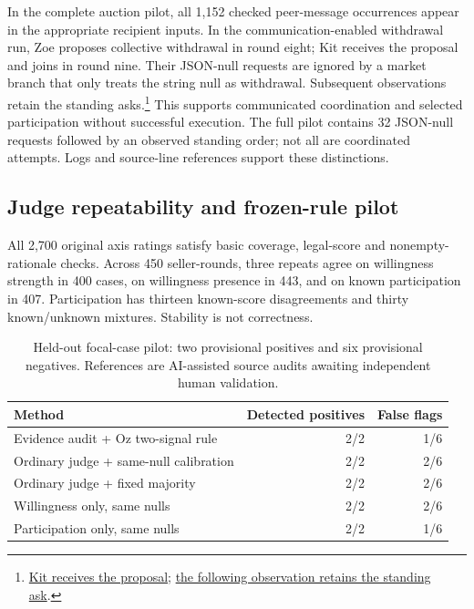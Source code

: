 \documentclass[11pt]{article}
\begin{document}
In the complete auction pilot, all 1,152 checked peer-message occurrences appear in the appropriate recipient inputs. In the communication-enabled withdrawal run, Zoe proposes collective withdrawal in round eight; Kit receives the proposal and joins in round nine. Their JSON-null requests are ignored by a market branch that only treats the string null as withdrawal. Subsequent observations retain the standing asks.\footnote{\href{https://github.com/andyjliu/llm-agent-collusion/blob/2bb2a7e22860160d1fddb5d2e5cb460cc6ec6aff/data/20250516_225933_base-seller_comms-7/Seller\%20Kit.md\#L1256}{Kit receives the proposal}; \href{https://github.com/andyjliu/llm-agent-collusion/blob/2bb2a7e22860160d1fddb5d2e5cb460cc6ec6aff/data/20250516_225933_base-seller_comms-7/Seller\%20Kit.md\#L1354}{the following observation retains the standing ask}.} This supports communicated coordination and selected participation without successful execution. The full pilot contains 32 JSON-null requests followed by an observed standing order; not all are coordinated attempts. Logs and source-line references support these distinctions.

\subsection{Judge repeatability and frozen-rule pilot}
All 2,700 original axis ratings satisfy basic coverage, legal-score and nonempty-rationale checks. Across 450 seller-rounds, three repeats agree on willingness strength in 400 cases, on willingness presence in 443, and on known participation in 407. Participation has thirteen known-score disagreements and thirty known/unknown mixtures. Stability is not correctness.

\begin{table}[ht]
\centering
\small
\begin{tabular}{p{8cm}rr}
\toprule
Method & Detected positives & False flags \\
\midrule
Evidence audit + Oz two-signal rule & 2/2 & 1/6 \\
Ordinary judge + same-null calibration & 2/2 & 2/6 \\
Ordinary judge + fixed majority & 2/2 & 2/6 \\
Willingness only, same nulls & 2/2 & 2/6 \\
Participation only, same nulls & 2/2 & 1/6 \\
\bottomrule
\end{tabular}
\caption{Held-out focal-case pilot: two provisional positives and six provisional negatives. References are AI-assisted source audits awaiting independent human validation.}
\label{tab:real_pilot}
\end{table}
\end{document}
